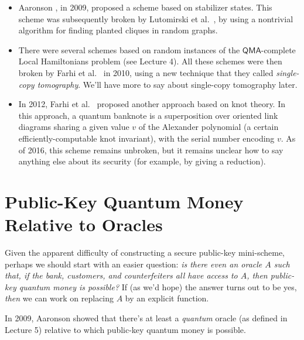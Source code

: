\documentclass[11pt]{report}
\theoremstyle{plain}
\theoremstyle{definition}
\begin{document}
\begin{itemize}
\item Aaronson \cite{Aar09}, in 2009, proposed a scheme based on stabilizer states.  This scheme was subsequently broken by Lutomirski et al.\ \cite{breaking}, by using a nontrivial algorithm for finding planted cliques in random graphs.
\item There were several schemes based on random instances of the $\mathsf{QMA}$-complete Local Hamiltonians problem (see Lecture 4).  All these schemes were then broken by Farhi et al.\ \cite{farhi:restore} in 2010, using a new technique that they called {\em single-copy tomography}.  We'll have more to say about single-copy tomography later.
\item In 2012, Farhi et al.\ \cite{knots} proposed another approach based on knot theory.  In this approach, a quantum banknote is a superposition over oriented link diagrams sharing a given value $v$ of the Alexander polynomial (a certain efficiently-computable knot invariant), with the serial number encoding $v$.  As of 2016, this scheme remains unbroken, but it remains unclear how to say anything else about its security (for example, by giving a reduction).
\end{itemize}

\section{Public-Key Quantum Money Relative to Oracles}

Given the apparent difficulty of constructing a secure public-key mini-scheme, perhaps we should start with an easier question: {\em is there even an oracle $A$ such that, if the bank, customers, and counterfeiters all have access to $A$, then public-key quantum money is possible?}  If (as we'd hope) the answer turns out to be yes, {\em then} we can work on replacing $A$ by an explicit function.

In 2009, Aaronson \cite{Aar09} showed that there's at least a {\em quantum} oracle (as defined in Lecture 5) relative to which public-key quantum money is possible.
\end{document}
